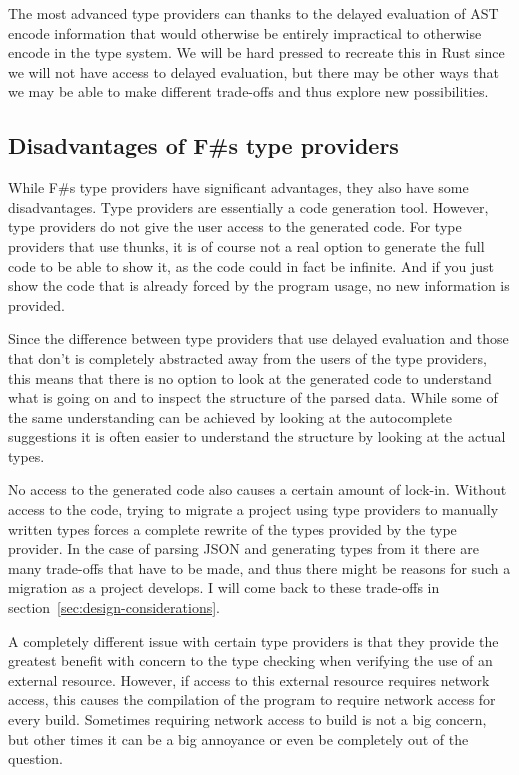 The most advanced type providers can thanks to the delayed evaluation of AST encode information that would otherwise be entirely impractical to otherwise encode in the type system. We will be hard pressed to recreate this in Rust since we will not have access to delayed evaluation, but there may be other ways that we may be able to make different trade-offs and thus explore new possibilities.

\subsection{Disadvantages of F\#s type providers}
\label{sec:disadvantages-of-type-providers}

While F\#s type providers have significant advantages, they also have some disadvantages. Type providers are essentially a code generation tool. However, type providers do not give the user access to the generated code. For type providers that use thunks, it is of course not a real option to generate the full code to be able to show it, as the  code could in fact be infinite. And if you just show the code that is already forced by the program usage, no new information is provided.


Since the difference between type providers that use delayed evaluation and those that don't is completely abstracted away from the users of the type providers, this means that there is no option to look at the generated code to understand what is going on and to inspect the structure of the parsed data. While some of the same understanding can be achieved by looking at the autocomplete suggestions it is often easier to understand the structure by looking at the actual types.


No access to the generated code also causes a certain amount of lock-in. Without access to the code, trying to migrate a project using type providers to manually written types forces a complete rewrite of the types provided by the type provider. In the case of parsing JSON and generating types from it there are many trade-offs that have to be made, and thus there might be reasons for such a migration as a project develops. I will come back to these trade-offs in section~\ref{sec:design-considerations}.

A completely different issue with certain type providers is that they provide the greatest benefit with concern to the type checking when verifying the use of an external resource. However, if access to this external resource requires network access, this causes the compilation of the program to require network access for every build. Sometimes requiring network access to build is not a big concern, but other times it can be a big annoyance or even be completely out of the question.


